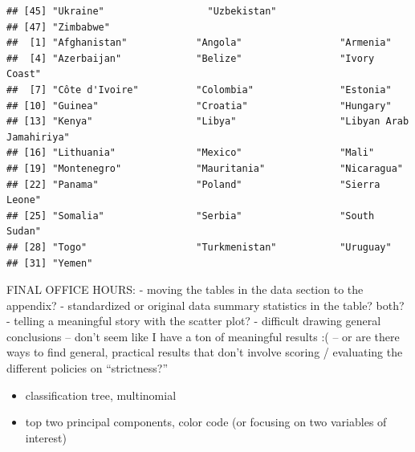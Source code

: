 \documentclass[]{article}
\newenvironment{Shaded}{\begin{snugshade}}{\end{snugshade}}
\newcommand{\CommentTok}[1]{\textcolor[rgb]{0.56,0.35,0.01}{\textit{#1}}}
\newcommand{\KeywordTok}[1]{\textcolor[rgb]{0.13,0.29,0.53}{\textbf{#1}}}
\newcommand{\NormalTok}[1]{#1}
\newcommand{\OperatorTok}[1]{\textcolor[rgb]{0.81,0.36,0.00}{\textbf{#1}}}
\newcommand{\StringTok}[1]{\textcolor[rgb]{0.31,0.60,0.02}{#1}}
\providecommand{\tightlist}{%
  \setlength{\itemsep}{0pt}\setlength{\parskip}{0pt}}
\begin{document}
\begin{verbatim}
## [45] "Ukraine"                  "Uzbekistan"              
## [47] "Zimbabwe"                
##  [1] "Afghanistan"            "Angola"                 "Armenia"               
##  [4] "Azerbaijan"             "Belize"                 "Ivory Coast"           
##  [7] "Côte d'Ivoire"          "Colombia"               "Estonia"               
## [10] "Guinea"                 "Croatia"                "Hungary"               
## [13] "Kenya"                  "Libya"                  "Libyan Arab Jamahiriya"
## [16] "Lithuania"              "Mexico"                 "Mali"                  
## [19] "Montenegro"             "Mauritania"             "Nicaragua"             
## [22] "Panama"                 "Poland"                 "Sierra Leone"          
## [25] "Somalia"                "Serbia"                 "South Sudan"           
## [28] "Togo"                   "Turkmenistan"           "Uruguay"               
## [31] "Yemen"
\end{verbatim}

\begin{Shaded}
\end{Shaded}

FINAL OFFICE HOURS: - moving the tables in the data section to the
appendix? - standardized or original data summary statistics in the
table? both? - telling a meaningful story with the scatter plot? -
difficult drawing general conclusions -- don't seem like I have a ton of
meaningful results :( -- or are there ways to find general, practical
results that don't involve scoring / evaluating the different policies
on ``strictness?''

\begin{itemize}
\tightlist
\item
  classification tree, multinomial
\item
  top two principal components, color code (or focusing on two variables
  of interest)
\end{itemize}
\end{document}
